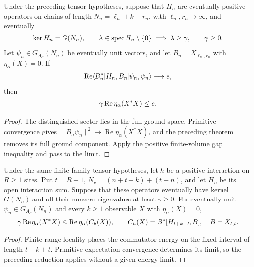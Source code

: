\begin{lemma}
    \label{thm:multiblock_commutator_gap_reduction}
    \leanok
    Under the preceding tensor hypotheses, suppose that $H_n$ are
    eventually positive operators on chains of length $N_n=\ell_n+k+r_n$,
    with $\ell_n,r_n\longrightarrow\infty$, and eventually
    \begin{align}
        \ker H_n=G(N_n),\qquad
        \lambda\in\operatorname{spec}H_n\setminus\{0\}\implies\lambda\geq\gamma,
        \qquad \gamma\geq0.
        \notag
    \end{align}
    Let $\psi_n\in G_{A_\alpha}(N_n)$ be eventually unit vectors, and
    let $B_n=X_{\ell_n,r_n}$ with $\eta_\alpha(X)=0$. If
    \begin{align}
        \operatorname{Re}\langle B_n^*[H_n,B_n]\psi_n,\psi_n\rangle
        \longrightarrow e,
        \notag
    \end{align}
    then
    \begin{align}
        \gamma\operatorname{Re}\eta_\alpha(X^*X)\leq e.
        \notag
    \end{align}
\end{lemma}
\begin{proof}\leanok
    The distinguished sector lies in the full ground space. Primitive
    convergence gives $\|B_n\psi_n\|^2\to\operatorname{Re}\eta_\alpha(X^*X)$,
    and the preceding theorem removes its full ground component. Apply the
    positive finite-volume gap inequality and pass to the limit.
\end{proof}

\begin{lemma}
    \label{thm:multiblock_local_open_interaction_commutator_gap}
    \leanok
    Under the same finite-family tensor hypotheses, let $h$ be a positive
    interaction on $R\geq1$ sites. Put $t=R-1$,
    $N_n=(n+t+k)+(t+n)$, and let $H_n$ be its open interaction sum.
    Suppose that these operators eventually have kernel $G(N_n)$ and
    all their nonzero eigenvalues at least $\gamma\geq0$. For eventually unit
    $\psi_n\in G_{A_\alpha}(N_n)$ and every $k\geq1$ observable $X$
    with $\eta_\alpha(X)=0$,
    \begin{align}
        \gamma\operatorname{Re}\eta_\alpha(X^*X)
        \leq\operatorname{Re}\eta_\alpha(C_h(X)),
        \qquad C_h(X)=B^*[H_{t+k+t},B],\quad B=X_{t,t}.
        \notag
    \end{align}
\end{lemma}
\begin{proof}\leanok
    Finite-range locality places the commutator energy on the fixed
    interval of length $t+k+t$. Primitive expectation convergence determines
    its limit, so the preceding reduction applies without a given
    energy limit.
\end{proof}

